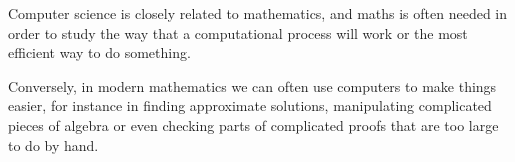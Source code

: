 Computer science is closely related to mathematics, and maths is often
needed in order to study the way that a computational process will work
or the most efficient way to do something.
\par
Conversely, in modern mathematics we can often use computers to make
things easier, for instance in finding approximate solutions, manipulating
complicated pieces of algebra or even checking parts of complicated proofs 
that are too large to do by hand.
